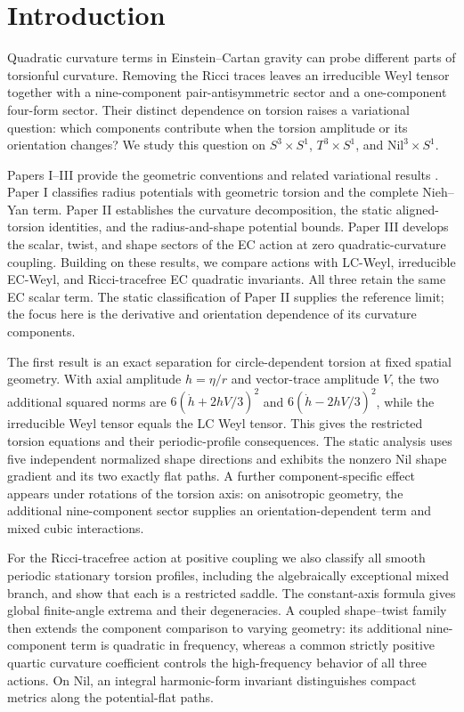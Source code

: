 \section{Introduction}

Quadratic curvature terms in Einstein--Cartan gravity can probe different parts of torsionful curvature. Removing the Ricci traces leaves an irreducible Weyl tensor together with a nine-component pair-antisymmetric sector and a one-component four-form sector. Their distinct dependence on torsion raises a variational question: which components contribute when the torsion amplitude or its orientation changes? We study this question on $S^3\times S^1$, $T^3\times S^1$, and $\mathrm{Nil}^3\times S^1$.

Papers I--III provide the geometric conventions and related variational results \cite{paper1,paper2,paper3}. Paper I classifies radius potentials with geometric torsion and the complete Nieh--Yan term. Paper II establishes the curvature decomposition, the static aligned-torsion identities, and the radius-and-shape potential bounds. Paper III develops the scalar, twist, and shape sectors of the EC action at zero quadratic-curvature coupling. Building on these results, we compare actions with LC-Weyl, irreducible EC-Weyl, and Ricci-tracefree EC quadratic invariants. All three retain the same EC scalar term. The static classification of Paper II supplies the reference limit; the focus here is the derivative and orientation dependence of its curvature components.

The first result is an exact separation for circle-dependent torsion at fixed spatial geometry. With axial amplitude $h=\eta/r$ and vector-trace amplitude $V$, the two additional squared norms are $6(\dot h+2hV/3)^2$ and $6(\dot h-2hV/3)^2$, while the irreducible Weyl tensor equals the LC Weyl tensor. This gives the restricted torsion equations and their periodic-profile consequences. The static analysis uses five independent normalized shape directions and exhibits the nonzero Nil shape gradient and its two exactly flat paths. A further component-specific effect appears under rotations of the torsion axis: on anisotropic geometry, the additional nine-component sector supplies an orientation-dependent term and mixed cubic interactions.

For the Ricci-tracefree action at positive coupling we also classify all
smooth periodic stationary torsion profiles, including the algebraically exceptional mixed branch, and
show that each is a restricted saddle. The constant-axis formula gives global
finite-angle extrema and their degeneracies. A coupled shape--twist family
then extends the component comparison to varying geometry: its additional
nine-component term is quadratic in frequency, whereas a common strictly
positive quartic curvature coefficient controls the high-frequency behavior
of all three actions. On Nil, an integral harmonic-form invariant distinguishes
compact metrics along the potential-flat paths.

